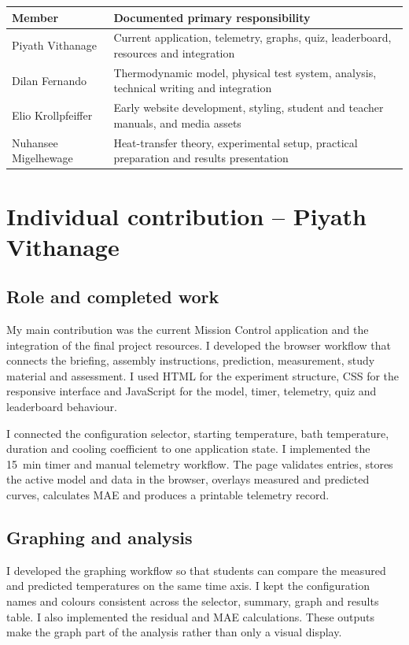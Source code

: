 \documentclass[9pt,a4paper]{extarticle}
\begin{document}
\begin{center}\small
\begin{tabularx}{\columnwidth}{|>{\raggedright\arraybackslash}X|>{\raggedright\arraybackslash}X|}\hline
\textbf{Member} & \textbf{Documented primary responsibility} \\ \hline
Piyath Vithanage & Current application, telemetry, graphs, quiz, leaderboard, resources and integration \\ \hline
Dilan Fernando & Thermodynamic model, physical test system, analysis, technical writing and integration \\ \hline
Elio Krollpfeiffer & Early website development, styling, student and teacher manuals, and media assets \\ \hline
Nuhansee Migelhewage & Heat-transfer theory, experimental setup, practical preparation and results presentation \\ \hline
\end{tabularx}
\end{center}
\clearpage
\onecolumn
\fontsize{12}{18}\selectfont
\setlength{\parskip}{4pt}
\section*{Individual contribution -- Piyath Vithanage}
\subsection*{Role and completed work}
My main contribution was the current Mission Control application and the integration of the final project resources. I developed the browser workflow that connects the briefing, assembly instructions, prediction, measurement, study material and assessment. I used HTML for the experiment structure, CSS for the responsive interface and JavaScript for the model, timer, telemetry, quiz and leaderboard behaviour.

I connected the configuration selector, starting temperature, bath temperature, duration and cooling coefficient to one application state. I implemented the \SI{15}{\minute} timer and manual telemetry workflow. The page validates entries, stores the active model and data in the browser, overlays measured and predicted curves, calculates MAE and produces a printable telemetry record.

\subsection*{Graphing and analysis}
I developed the graphing workflow so that students can compare the measured and predicted temperatures on the same time axis. I kept the configuration names and colours consistent across the selector, summary, graph and results table. I also implemented the residual and MAE calculations. These outputs make the graph part of the analysis rather than only a visual display.
\end{document}
